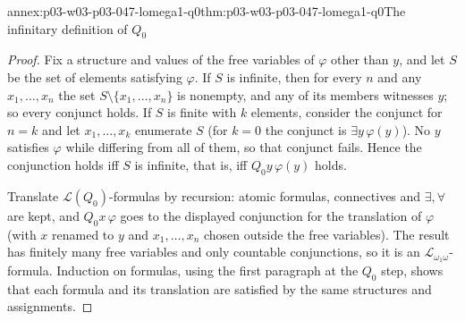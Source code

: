 \begin{annexitem}{annex:p03-w03-p03-047-lomega1-q0}{thm:p03-w03-p03-047-lomega1-q0}{The infinitary definition of \(Q_0\)}
\begin{proof}
Fix a structure and values of the free variables of \(\varphi\) other than
\(y\), and let \(S\) be the set of elements satisfying \(\varphi\).  If \(S\)
is infinite, then for every \(n\) and any \(x_1,\ldots,x_n\) the set
\(S\setminus\{x_1,\ldots,x_n\}\) is nonempty, and any of its members
witnesses \(y\); so every conjunct holds.  If \(S\) is finite with \(k\)
elements, consider the conjunct for \(n=k\) and let \(x_1,\ldots,x_k\)
enumerate \(S\) (for \(k=0\) the conjunct is \(\exists y\,\varphi(y)\)).  No
\(y\) satisfies \(\varphi\) while differing from all of them, so that
conjunct fails.  Hence the conjunction holds iff \(S\) is infinite, that is,
iff \(Q_0y\,\varphi(y)\) holds.

Translate \(\mathscr L(Q_0)\)-formulas by recursion: atomic formulas,
connectives and \(\exists,\forall\) are kept, and \(Q_0x\,\varphi\) goes to
the displayed conjunction for the translation of \(\varphi\) (with \(x\)
renamed to \(y\) and \(x_1,\ldots,x_n\) chosen outside the free variables).
The result has finitely many free variables and only countable
conjunctions, so it is an \(\mathscr L_{\omega_1\omega}\)-formula.  Induction
on formulas, using the first paragraph at the \(Q_0\) step, shows that each
formula and its translation are satisfied by the same structures and
assignments.
\end{proof}
\end{annexitem}

